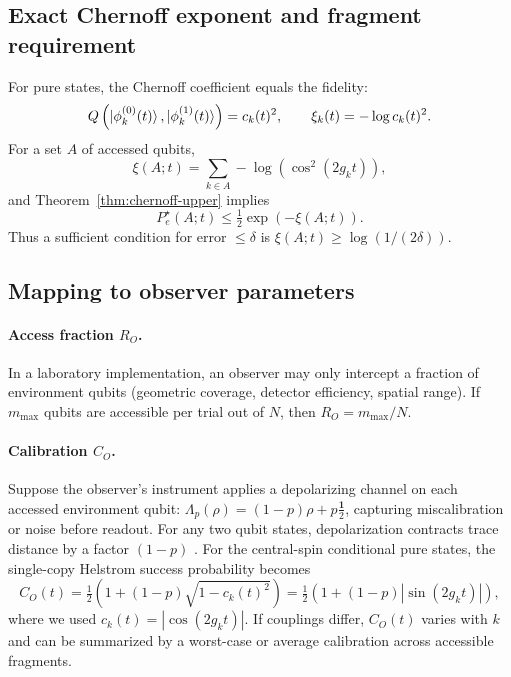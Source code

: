 \documentclass[11pt]{article}
\newcommand{\1}{\mathbf{1}}
\newcommand{\QCBcoef}{Q}
\newcommand{\QCBdist}{\xi}
\theoremstyle{definition}
\theoremstyle{plain}
\begin{document}
\subsection{Exact Chernoff exponent and fragment requirement}

For pure states, the Chernoff coefficient equals the fidelity:
\[
\QCBcoef\left(\ket{\phi_k^{(0)}(t)},\ket{\phi_k^{(1)}(t)}\right)=c_k(t)^2,
\qquad
\QCBdist_k(t)=-\log c_k(t)^2.
\]
For a set $A$ of accessed qubits,
\begin{equation}
\QCBdist(A;t)=\sum_{k\in A} -\log\left(\cos^2(2 g_k t)\right),
\label{eq:xi-centralspin}
\end{equation}
and Theorem~\ref{thm:chernoff-upper} implies
\[
P_e^\star(A;t)\le \tfrac12 \exp\!\left(-\QCBdist(A;t)\right).
\]
Thus a sufficient condition for error $\le\delta$ is $\QCBdist(A;t)\ge \log(1/(2\delta))$.

\subsection{Mapping to observer parameters}

\paragraph{Access fraction $R_O$.}
In a laboratory implementation, an observer may only intercept a fraction of environment qubits (geometric coverage, detector efficiency, spatial range).
If $m_{\max}$ qubits are accessible per trial out of $N$, then $R_O=m_{\max}/N$.

\paragraph{Calibration $C_O$.}
Suppose the observer's instrument applies a depolarizing channel on each accessed environment qubit:
$\Lambda_p(\rho)=(1-p)\rho+p\frac{\1}{2}$, capturing miscalibration or noise before readout.
For any two qubit states, depolarization contracts trace distance by a factor $(1-p)$ \citep{Watrous2018}.
For the central-spin conditional pure states, the single-copy Helstrom success probability becomes
\[
C_O(t)=\tfrac12\left(1+(1-p)\sqrt{1-c_k(t)^2}\right)
=\tfrac12\left(1+(1-p)|\sin(2 g_k t)|\right),
\]
where we used $c_k(t)=|\cos(2 g_k t)|$.
If couplings differ, $C_O(t)$ varies with $k$ and can be summarized by a worst-case or average calibration across accessible fragments.
\end{document}
